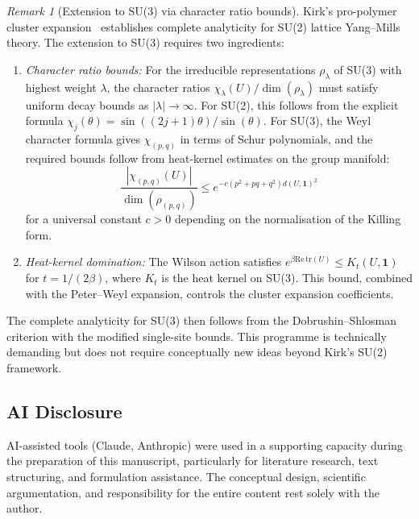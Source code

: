 \documentclass[12pt,a4paper]{article}
\theoremstyle{definition}
\theoremstyle{plain}
\theoremstyle{remark}
\newtheorem{remark}[definition]{Remark}
\begin{document}
\begin{remark}[Extension to SU(3) via character ratio bounds]
\label{rem:su3-extension}
Kirk's pro-polymer cluster expansion~\cite{Kirk2026} establishes complete analyticity for SU(2) lattice Yang--Mills theory. The extension to SU(3) requires two ingredients:
\begin{enumerate}
\item \emph{Character ratio bounds:} For the irreducible representations $\rho_\lambda$ of SU(3) with highest weight $\lambda$, the character ratios $\chi_\lambda(U)/\dim(\rho_\lambda)$ must satisfy uniform decay bounds as $|\lambda| \to \infty$. For SU(2), this follows from the explicit formula $\chi_j(\theta) = \sin((2j+1)\theta)/\sin(\theta)$. For SU(3), the Weyl character formula gives $\chi_{(p,q)}$ in terms of Schur polynomials, and the required bounds follow from heat-kernel estimates on the group manifold:
\[
\frac{|\chi_{(p,q)}(U)|}{\dim(\rho_{(p,q)})} \leq e^{-c(p^2 + pq + q^2) d(U, \mathbf{1})^2}
\]
for a universal constant $c > 0$ depending on the normalisation of the Killing form.
\item \emph{Heat-kernel domination:} The Wilson action satisfies $e^{\beta \mathrm{Re}\,\mathrm{tr}(U)} \leq K_t(U, \mathbf{1})$ for $t = 1/(2\beta)$, where $K_t$ is the heat kernel on SU(3). This bound, combined with the Peter--Weyl expansion, controls the cluster expansion coefficients.
\end{enumerate}
The complete analyticity for SU(3) then follows from the Dobrushin--Shlosman criterion with the modified single-site bounds. This programme is technically demanding but does not require conceptually new ideas beyond Kirk's SU(2) framework.
\end{remark}

\subsection*{AI Disclosure}
AI-assisted tools (Claude, Anthropic) were used in a supporting capacity during the
preparation of this manuscript, particularly for literature research,
text structuring, and formulation assistance. The conceptual design,
scientific argumentation, and responsibility for the entire content
rest solely with the author.
\end{document}
